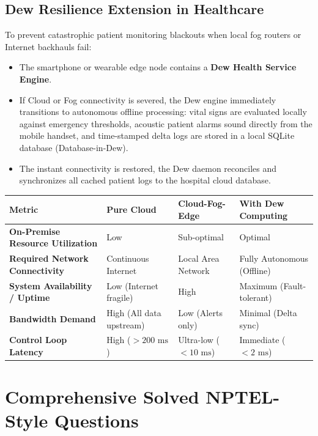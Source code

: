 \documentclass[11pt,a4paper,openany]{report}
\begin{document}
\subsection{Dew Resilience Extension in Healthcare}
To prevent catastrophic patient monitoring blackouts when local fog routers or Internet backhauls fail:
\begin{itemize}[leftmargin=*]
  \item The smartphone or wearable edge node contains a \textbf{Dew Health Service Engine}.
  \item If Cloud or Fog connectivity is severed, the Dew engine immediately transitions to autonomous offline processing: vital signs are evaluated locally against emergency thresholds, acoustic patient alarms sound directly from the mobile handset, and time-stamped delta logs are stored in a local SQLite database (Database-in-Dew).
  \item The instant connectivity is restored, the Dew daemon reconciles and synchronizes all cached patient logs to the hospital cloud database.
\end{itemize}

\begin{center}
\begin{tabularx}{\textwidth}{>{\bfseries}l X X X}
\toprule
Metric & Pure Cloud & Cloud-Fog-Edge & With Dew Computing\\
\midrule
On-Premise Resource Utilization & Low & Sub-optimal & Optimal\\
Required Network Connectivity & Continuous Internet & Local Area Network & Fully Autonomous (Offline)\\
System Availability / Uptime & Low (Internet fragile) & High & Maximum (Fault-tolerant)\\
Bandwidth Demand & High (All data upstream) & Low (Alerts only) & Minimal (Delta sync)\\
Control Loop Latency & High ($> 200\text{ ms}$) & Ultra-low ($< 10\text{ ms}$) & Immediate ($< 2\text{ ms}$)\\
\bottomrule
\end{tabularx}
\end{center}

\newpage
\section{Comprehensive Solved NPTEL-Style Questions}
\end{document}
